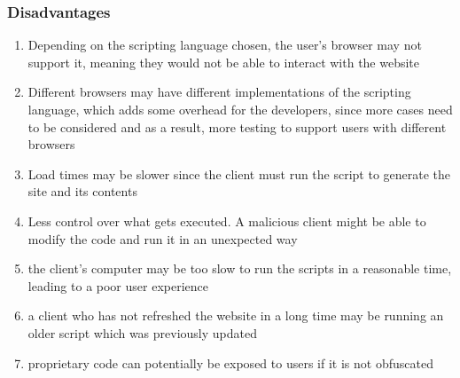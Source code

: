 \subsubsection*{Disadvantages}
\begin{enumerate}
  \item Depending on the scripting language chosen, the user's browser may not
    support it, meaning they would not be able to interact with the website
  \item Different browsers may have different implementations of the scripting
    language, which adds some overhead for the developers, since more cases need
    to be considered and as a result, more testing to support users with
    different browsers
  \item Load times may be slower since the client must run the script to
    generate the site and its contents
  \item Less control over what gets executed. A malicious client might be able
    to modify the code and run it in an unexpected way
  \item the client's computer may be too slow to run the scripts in a reasonable
    time, leading to a poor user experience
  \item a client who has not refreshed the website in a long time may be running
    an older script which was previously updated
  \item proprietary code can potentially be exposed to users if it is not
    obfuscated
\end{enumerate}

